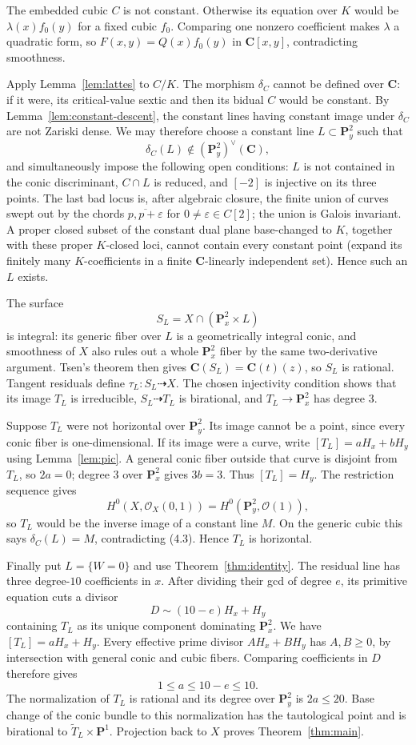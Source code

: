 \documentclass[11pt]{amsart}
\theoremstyle{definition}
\theoremstyle{remark}
\newcommand{\PP}{\mathbf{P}}
\newcommand{\CC}{\mathbf{C}}
\newcommand{\Hx}{H_x}
\newcommand{\Hy}{H_y}
\begin{document}
The embedded cubic $C$ is not constant.  Otherwise its equation over $K$
would be $\lambda(x)f_0(y)$ for a fixed cubic $f_0$.  Comparing one nonzero
coefficient makes $\lambda$ a quadratic form, so
$F(x,y)=Q(x)f_0(y)$ in $\CC[x,y]$, contradicting smoothness.

Apply Lemma~\ref{lem:lattes} to $C/K$.  The morphism $\delta_C$ cannot be
defined over $\CC$: if it were, its critical-value sextic and then its
bidual $C$ would be constant.  By Lemma~\ref{lem:constant-descent}, the
constant lines having constant image under $\delta_C$ are not Zariski dense.
We may therefore choose a constant line $L\subset\PP^2_y$ such that
\[
\delta_C(L)\notin(\PP^2_y)^\vee(\CC),
\tag{4.3}
\]
and simultaneously impose the following open conditions: $L$ is not
contained in the conic discriminant, $C\cap L$ is reduced, and $[-2]$ is
injective on its three points.  The last bad locus is, after algebraic
closure, the finite union of curves swept out by the chords
$\overline{p,p+\varepsilon}$ for $0\ne\varepsilon\in C[2]$; the union is
Galois invariant.  A proper closed subset of the constant dual plane
base-changed to $K$, together with these proper $K$-closed loci, cannot
contain every constant point (expand its finitely many $K$-coefficients in a
finite $\CC$-linearly independent set).  Hence such an $L$ exists.

The surface
\[
S_L=X\cap(\PP^2_x\times L)
\]
is integral: its generic fiber over $L$ is a geometrically integral conic,
and smoothness of $X$ also rules out a whole $\PP^2_x$ fiber by the same
two-derivative argument.  Tsen's theorem then gives
$\CC(S_L)=\CC(t)(z)$, so $S_L$ is rational.  Tangent residuals define
$\tau_L:S_L\dashrightarrow X$.  The chosen injectivity condition shows
that its image $T_L$ is irreducible, $S_L\dashrightarrow T_L$ is birational,
and $T_L\to\PP^2_x$ has degree $3$.

Suppose $T_L$ were not horizontal over $\PP^2_y$.  Its image cannot be a
point, since every conic fiber is one-dimensional.  If its image were a
curve, write $[T_L]=a\Hx+b\Hy$ using Lemma~\ref{lem:pic}.  A general conic
fiber outside that curve is disjoint from $T_L$, so $2a=0$; degree $3$ over
$\PP^2_x$ gives $3b=3$.  Thus $[T_L]=\Hy$.  The restriction sequence gives
\[
H^0(X,\mathcal O_X(0,1))
=H^0(\PP^2_y,\mathcal O(1)),
\]
so $T_L$ would be the inverse image of a constant line $M$.  On the generic
cubic this says $\delta_C(L)=M$, contradicting (4.3).  Hence $T_L$ is
horizontal.

Finally put $L=\{W=0\}$ and use Theorem~\ref{thm:identity}.  The residual
line has three degree-$10$ coefficients in $x$.  After dividing their gcd
of degree $e$, its primitive equation cuts a divisor
\[
D\sim(10-e)\Hx+\Hy
\]
containing $T_L$ as its unique component dominating $\PP^2_x$.  We have
$[T_L]=a\Hx+\Hy$.  Every effective prime divisor
$A\Hx+B\Hy$ has $A,B\geq0$, by intersection with general conic and cubic
fibers.  Comparing coefficients in $D$ therefore gives
\[
1\leq a\leq10-e\leq10.
\]
The normalization of $T_L$ is rational and its degree over $\PP^2_y$ is
$2a\leq20$.  Base change of the conic bundle to this normalization has the
tautological point and is birational to $\widetilde T_L\times\PP^1$.
Projection back to $X$ proves Theorem~\ref{thm:main}.
\end{document}
